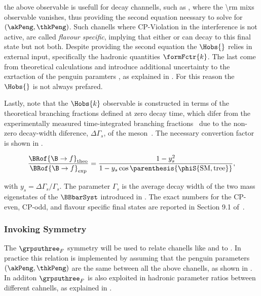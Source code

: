 \noindent the above observable is usefull for decay channells, such as \BsJpsiKst, where the \Acp{\rm mix} observable vanishes,
thus providing the second equation neessary to solve for $(\akPeng,\thkPeng)$. Such chanells
where CP-Violation in the interference is not active, are called {\it flavour specific}, implying
that either \Bs or \Bsb can decay to this final state but not both.
Despite providing the second equation the $\Hobs{}$ relies in external input, specifically the hadronic quantities $\formFctr{k}$.
The last come from theoretical calculations and introduce additional uncertainty to the exrtaction of the penguin paramters
, as explained in . For this reason the $\Hobs{}$ is not always prefared.

Lastly, note that the $\Hobs{k}$ observable is constructed in terms of the theoretical branching fractions
defined at zero decay time, which difer from the experimentally measured time-integrated branching fractions~\cite{DeBruyn:2012wj}
due to the non-zero decay-width diference, $\Delta\Gamma_s$, of the \Bs meson~\cite{hfag-2014}. The necessary convertion factor
is shown in .

\begin{equation}
  \centering
  \frac{\BRof{\B\to f}_{\rm theo}}{\BRof{\B\to f}_{\rm exp}} = \frac{1-y_s^2}{1-y_s\cos\parenthesis{\phiS{\rm SM, tree}}},
  \label{br_conversion_formula}
\end{equation}

\noindent with $y_s = \Delta\Gamma_s / \Gamma_s$. The parameter $\Gamma_s$ is the average decay width of the two
mass eigenstates of the $\BBbarSyst$ introduced in . The exact numbers for the CP-even,
CP-odd, and flavour specific final states are reported in Section 9.1 of~\cite{bsjpsikst-paper}.

\subsubsection{Invoking \grpsuthree Symmetry}
The $\grpsuthree_{F}$ symmetry will be used to relate chanells like \BsJpsiKst and \BsJpsiRho to \BsJpsiPhi.
In practice this relation is implemented by assuming that the penguin parameters $(\akPeng,\thkPeng)$
are the same between all the above chanells, as shown in . In additon $\grpsuthree_{F}$
is also exploited in hadronic parameter ratios between different cahnells, as explained in .
